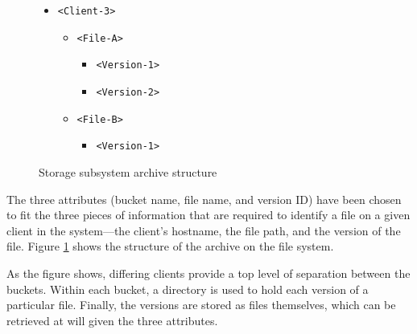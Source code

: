 \begin{figure}[H]
\begin{itemize}
\begin{itemize}
            \end{itemize}
        \item \verb!<Client-3>!
            \begin{itemize}
                \item \verb!<File-A>!
                    \begin{itemize}
                        \item \verb!<Version-1>!
                        \item \verb!<Version-2>!
                    \end{itemize}
                \item \verb!<File-B>!
                    \begin{itemize}
                        \item \verb!<Version-1>!
                    \end{itemize}
            \end{itemize}
    \end{itemize}
    \caption{Storage subsystem archive structure}
    \label{fig:archive-structure}
\end{figure}

The three attributes (bucket name, file name, and version ID) have been chosen
to fit the three pieces of information that are required to identify a file on
a given client in the system---the client's hostname, the file path, and the
version of the file. Figure \ref{fig:archive-structure} shows the structure of
the archive on the file system.

As the figure shows, differing clients provide a top level of separation
between the buckets. Within each bucket, a directory is used to hold each
version of a particular file. Finally, the versions are stored as files
themselves, which can be retrieved at will given the three attributes.
